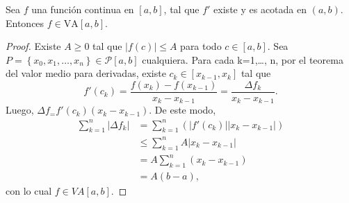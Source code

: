 \begin{lemma}

Sea $f$ una función continua en $\left[a,b\right]$, tal que $f'$ existe y es acotada en $\left(a,b\right)$. Entonces $f\in \text{VA}\left[a,b\right]$.

\end{lemma}

\begin{proof}

Existe $A\geq 0$ tal que $|f\left(c\right)| \leq A$ para todo $c \in \left[a,b\right]$. Sea $P= \left\lbrace x_0, x_1, \dots, x_n \right\rbrace \in \mathcal{P}\left[a,b\right]$ cualquiera. Para cada k=1,\dots, n, por el teorema del valor medio para derivadas, existe $c_k\in \left[x_{k-1},x_k\right]$ tal que 
\begin{equation*}
  f'\left(c_k\right)=\frac{f\left(x_k\right)-f\left(x_{k-1}\right)}{x_k-x_{k-1}}=\frac{\Delta f_k}{x_k-x_{k-1}}.
\end{equation*}
Luego, $\Delta f_ = f'\left(c_k\right)\left(x_k-x_{k-1}\right)$. De este modo,
\begin{align*}
  \sum_{k=1}^{n}|\Delta f_{k}|&=\sum_{k=1}^{n}\left(|f'\left(c_k\right)||x_k-x_{k-1}|\right)\\
  &\leq \sum_{k=1}^{n}A|x_k-x_{k-1}|\\
  &=A\sum_{k=1}^{n}\left(x_k-x_{k-1}\right)\\
  &=A\left(b-a\right),
\end{align*}
con lo cual $f\in \textit{VA}\left[a,b\right]$.

\end{proof}
